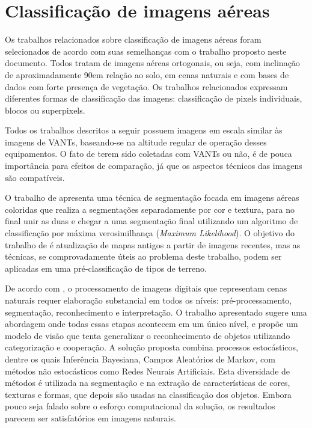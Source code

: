 
\section{Classificação de imagens aéreas}\label{sec:trClassificacao}

Os trabalhos relacionados sobre classificação de imagens aéreas foram selecionados de acordo com suas semelhanças com o trabalho proposto neste documento. Todos tratam de imagens aéreas ortogonais, ou seja, com inclinação de aproximadamente 90\degree em relação ao solo, em cenas naturais e com bases de dados com forte presença de vegetação. Os trabalhos relacionados expressam diferentes formas de classificação das imagens: classificação de pixels individuais, blocos ou superpixels.

Todos os trabalhos descritos a seguir possuem imagens em escala similar às imagens de VANTs, baseando-se na altitude regular de operação desses equipamentos. O fato de terem sido coletadas com VANTs ou não, é de pouca importância para efeitos de comparação, já que os aspectos técnicos das imagens são compatíveis.

O trabalho de  apresenta uma técnica de segmentação focada em imagens aéreas coloridas que realiza a segmentações separadamente por cor e textura, para no final unir as duas e chegar a uma segmentação final utilizando um algoritmo de classificação por máxima verosimilhança (\textit{Maximum Likelihood}). O objetivo do trabalho de  é atualização de mapas antigos a partir de imagens recentes, mas as técnicas, se comprovadamente úteis ao problema deste trabalho, podem ser aplicadas em uma pré-classificação de tipos de terreno.

De acordo com , o processamento de imagens digitais que representam cenas naturais requer elaboração substancial em todos os níveis: pré-processamento, segmentação, reconhecimento e interpretação. O trabalho apresentado sugere uma abordagem onde todas essas etapas acontecem em um único nível, e propõe um modelo de visão que tenta generalizar o reconhecimento de objetos utilizando categorização e cooperação.  A solução proposta combina processos estocásticos, dentre os quais Inferência Bayesiana, Campos Aleatórios de Markov, com métodos não estocásticos como Redes Neurais Artificiais. Esta diversidade de métodos é utilizada na segmentação e na extração de características de cores, texturas e formas, que depois são usadas na classificação dos objetos. Embora pouco seja falado sobre o esforço computacional da solução, os resultados parecem ser satisfatórios em imagens naturais.


